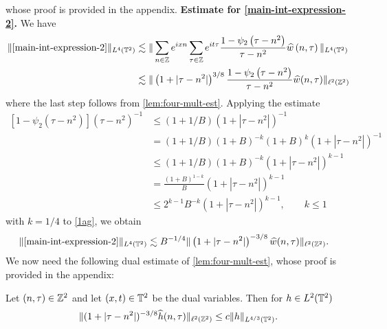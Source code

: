 %
%
whose proof is provided in the appendix.
%
%
\vskip0.1in
%
%
%
%
%
%
\vskip0.1in
\textbf{Estimate for \eqref{main-int-expression-2}.}
We have
%
%
\begin{equation}
	\label{1ag}
	\begin{split}
		\|\eqref{main-int-expression-2}\|_{L^4(\mathbb{T}^2)} 
		& \lesssim \| \sum_{n \in \mathbb{Z}} e^{ixn} \sum_{\tau \in
		\mathbb{Z}} e^{it \tau} \frac{1- \psi_2\left( \tau - n^2 \right)}{\tau - 
		n^2} \widehat{w}\left( n, \tau \right) \|_{L^4(\mathbb{T}^2)}
		\\
		& \lesssim  \|\left( 1 + |\tau - n^2| \right)^{3/8}
		\frac{1- \psi_2\left( \tau - n^2 \right)}{\tau - 
		n^2} \widehat{w}(n, \tau) \|_{\ell^2(\mathbb{Z}^2)}
	\end{split}
\end{equation}
%
%
where the last step follows from \cref{lem:four-mult-est}. Applying the 
estimate
%
%
\begin{equation}
	\label{2ag}
	\begin{split}
		\left[ 1 - \psi_2\left( \tau - n^2 \right) \right]
		\left( \tau - n^2 \right)^{-1}
		& \le \left( 1 + 1 /B \right)\left( 1 + |\tau - n^2| 
		\right)^{-1}
		\\
		& = \left( 1 + 1/B \right)\left( 1 + B \right)^{-k }
		\left( 1 + B \right)^k \left( 1 + |\tau - n^2| \right)^{-1} 
				\\
		& \le \left( 1 + 1/B \right)\left( 1 + B \right)^{-k 
		} \left( 1 + |\tau - n^2| \right)^{k-1}
		\\
		& = \frac{\left( 1 + B \right)^{1-k }}{B} \left( 1 + |\tau - 
		n^2|
		\right)^{k - 1}
		\\
		& \le 2^{k -1} B^{-k } \left( 1 + |\tau - n^2| \right)^{k - 1}, 
		\qquad k \le 1
	\end{split}
\end{equation}
%
%
with $k = 1/4$ to \eqref{1ag}, we obtain 
%
%
\begin{equation}
	\label{3ag}
	\begin{split}
		\|\eqref{main-int-expression-2}\|_{L^4(\mathbb{T}^2)}
		& \lesssim  
		B^{-1/4} \|\left( 1 + |\tau - n^2| \right)^{-3/8} \widehat{w} (n, 
		\tau) \|_{\ell^2(\mathbb{Z}^2)}.
	\end{split}
\end{equation}
%
%
We now need the following dual estimate of 
\cref{lem:four-mult-est}, whose proof is provided in the appendix:
%
%
\begin{corollary}
	\label{cor:four-mult-est-dual}
Let $(n, \tau) \in \mathbb{Z}^2$ and let  $(x, t) \in \mathbb{T}^2$
be the dual variables. Then for $h \in L^2(\mathbb{T}^2)$
%
%
\begin{equation}
	\label{four-mult-est-dual}
	\|(1 + |\tau - 
	n^2|)^{-3/8} \widehat{h}(n, \tau) \|_{\ell^2(\mathbb{Z}^2)} \le 
	c \|h\|_{L^{4/3}(\mathbb{T}^2)}.
\end{equation}
%
%
\end{corollary}
